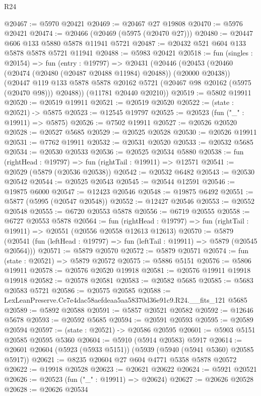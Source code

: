 \begin{lexlean}{R24}
\begin{coremodule}
@20467 := @5970 @20421
@20469 := @20467 @27 @19808
@20470 := @5976 @20421
@20474 := @20466 (@20469 (@5975 (@20470 @27)))
@20480 := @20447 @606 @133 @5880 @5878 @11941 @5721
@20487 := @20432 @521 @604 @133 @5878 @5878 @5721 @11941
@20488 := @5983 @20421
@20518 := fun (singles : @20154) =>
  fun (entry : @19797) =>
  @20431
    (@20446
      (@20453
        (@20460 (@20474 (@20480 (@20487 @20488 @11984) @20488)) (@20000 @20438))
        (@20447 @119 @133 @5878 @5878 @20162 @5721 (@20467 @98 @20162 (@5975 (@20470 @98))) @20488))
      (@11781 @20440 @20210))
@20519 := @5802 @19911
@20520 := @20519 @19911
@20521 := @20519 @20520
@20522 := (state : @20521) -> @5875
@20523 := @12545 @19797
@20525 := @20523 (fun ("_" : @19911) => @5875)
@20526 := @7502 @19911
@20527 := @20526 @20520
@20528 := @20527 @5685
@20529 := @20525 @20528
@20530 := @20526 @19911
@20531 := @7762 @19911
@20532 := @20531 @20520
@20533 := @20532 @5685
@20534 := @20530 @20533
@20536 := @20525 @20534 @5880
@20538 := fun (rightHead : @19797) => fun (rightTail : @19911) => @12571
@20541 := @20529 (@5879 (@20536 @20538))
@20542 := @20532 @6482
@20543 := @20530 @20542
@20544 := @20525 @20543
@20545 := @20544 @12591
@20546 := @19875 @6000
@20547 := @12423 @20546
@20548 := @19875 @6492
@20551 := @5877 (@5995 (@20547 @20548))
@20552 := @12427 @20546
@20553 := @20552 @20548
@20555 := @6720 @20553 @5878
@20556 := @6719 @20555
@20558 := @6727 @20553 @5878
@20564 := fun (rightHead : @19797) =>
  fun (rightTail : @19911) => @20551 (@20556 @20558 @12613 @12613)
@20570 := @5879
    (@20541 (fun (leftHead : @19797) => fun (leftTail : @19911) => @5879 (@20545 @20564)))
@20571 := @5879 @20570
@20572 := @5879 @20571
@20574 := fun (state : @20521) => @5879 @20572
@20575 := @5886 @5151
@20576 := @5806 @19911
@20578 := @20576 @20520 @19918
@20581 := @20576 @19911 @19918 @19918
@20582 := @20578 @20581
@20583 := @20582 @5685
@20585 := @5683 @20583 @5721
@20586 := @20575 @20585
@20588 := LexLeanPreserve.Ce7e4dac58aefdeaa5aa58370d36e91c9.R24.__fits_121 @5685
@20589 := @5892 @20588
@20591 := @5857 @20521 @20582
@20592 := @12646 @5678
@20593 := @20592 @5685
@20594 := @20591 @20593
@20595 := @20589 @20594
@20597 := (state : @20521) -> @20586 @20595
@20601 := @5903 @5151 @20585 @20595 @5360
@20604 := @5910 (@5914 @20583) @5917
@20614 := @20601 @20604 (@5923 (@5933 @5151)) (@5939 (@5940 (@5941 @5360) @20585 @5917))
@20621 := @8235 @20604 @27 @604 @4771 @5358 @5878 @20572
@20622 := @19918 @20528
@20623 := @20621 @20622
@20624 := @5921 @20521
@20626 := @20523 (fun ("_" : @19911) => @20624)
@20627 := @20626 @20528
@20628 := @20626 @20534

\end{coremodule}
\end{lexlean}
